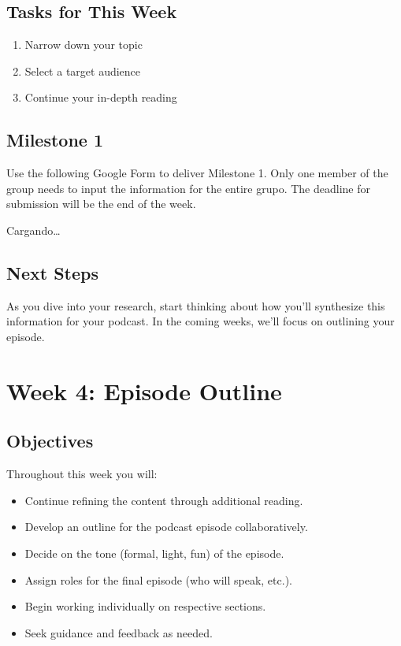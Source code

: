 \documentclass[
  letterpaper,
  DIV=11,
  numbers=noendperiod]{scrreprt}
\providecommand{\tightlist}{%
  \setlength{\itemsep}{0pt}\setlength{\parskip}{0pt}}\usepackage{longtable,booktabs,array}
\begin{document}
\section{Tasks for This Week}\label{tasks-for-this-week-1}

\begin{enumerate}
\def\labelenumi{\arabic{enumi}.}
\tightlist
\item
  Narrow down your topic
\item
  Select a target audience
\item
  Continue your in-depth reading
\end{enumerate}

\section{Milestone 1}\label{milestone-1}

Use the following Google Form to deliver Milestone 1. Only one member of
the group needs to input the information for the entire grupo. The
deadline for submission will be the end of the week.

Cargando\ldots{}

\section{Next Steps}\label{next-steps-3}

As you dive into your research, start thinking about how you'll
synthesize this information for your podcast. In the coming weeks, we'll
focus on outlining your episode.

\chapter{Week 4: Episode Outline}\label{week-4-episode-outline-1}

\section{Objectives}\label{objectives-3}

Throughout this week you will:

\begin{itemize}
\tightlist
\item
  Continue refining the content through additional reading.
\item
  Develop an outline for the podcast episode collaboratively.
\item
  Decide on the tone (formal, light, fun) of the episode.
\item
  Assign roles for the final episode (who will speak, etc.).
\item
  Begin working individually on respective sections.
\item
  Seek guidance and feedback as needed.
\end{itemize}
\end{document}
